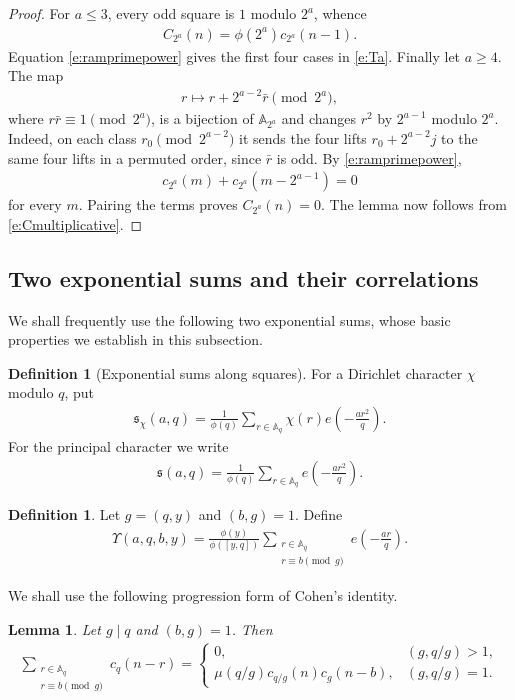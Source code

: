 \documentclass[12pt,reqno]{amsart}
\numberwithin{equation}{section}
\newtheorem{lemma}[equation]{Lemma}
\theoremstyle{definition}
\newtheorem{definition}[equation]{Definition}
\theoremstyle{remark}
\begin{document}
\begin{proof}
For $a\leq3$, every odd square is $1$ modulo $2^a$, whence
\begin{align*}
 C_{2^a}(n)=\phi(2^a)c_{2^a}(n-1).
\end{align*}
Equation \eqref{e:ramprimepower} gives the first four cases in
\eqref{e:Ta}.  Finally let $a\geq4$.  The map
\begin{align*}
 r\longmapsto r+2^{a-2}\bar r\pmod{2^a},
\end{align*}
where $r\bar r\equiv1\pmod{2^a}$, is a bijection of
$\mathbb A_{2^a}$ and changes $r^2$ by $2^{a-1}$ modulo $2^a$.
Indeed, on each class $r_0\pmod{2^{a-2}}$ it sends the four lifts
$r_0+2^{a-2}j$ to the same four lifts in a permuted order, since
$\bar r$ is odd.
By \eqref{e:ramprimepower},
\begin{align*}
 c_{2^a}(m)+c_{2^a}(m-2^{a-1})=0
\end{align*}
for every $m$.  Pairing the terms proves $C_{2^a}(n)=0$.  The lemma
now follows from \eqref{e:Cmultiplicative}.
\end{proof}

\subsection{Two exponential sums and their correlations}


We shall frequently use the following two exponential sums, whose basic properties we establish in this subsection.
\begin{definition}[Exponential sums along squares]
For a Dirichlet character $\chi$ modulo $q$, put
\begin{align}\label{e:mathfraksgeneral}
 \mathfrak s_\chi(a,q)
 =\frac1{\phi(q)}\sum_{r\in\mathbb A_q}
 \chi(r)e\left(-\frac{ar^2}{q}\right).
\end{align}
For the principal character we write
\begin{align}\label{e:mathfraks}
 \mathfrak s(a,q)
 =\frac1{\phi(q)}\sum_{r\in\mathbb A_q}
 e\left(-\frac{ar^2}{q}\right).
\end{align}
\end{definition}

\begin{definition}
Let $g=(q,y)$ and $(b,g)=1$.  Define
\begin{align}\label{e:upsilondef}
 \Upsilon(a,q,b,y)=\frac{\phi(y)}{\phi([y,q])}
 \sum_{\substack{r\in\mathbb A_q\\r\equiv b\pmod g}}
 e\left(-\frac{ar}{q}\right).
\end{align}
\end{definition}
We shall use the following progression form of Cohen's identity.
\begin{lemma}
\label{l:progressioncohen}
Let $g\mid q$ and $(b,g)=1$. Then
\begin{align}\label{e:progcohenid}
 \sum_{\substack{r\in\mathbb A_q\\r\equiv b\pmod g}}c_q(n-r)
 =
 \begin{cases}
  0,&(g,q/g)>1,\\
  \mu(q/g)c_{q/g}(n)c_g(n-b),&(g,q/g)=1.
 \end{cases}
\end{align}
\end{lemma}
\end{document}
